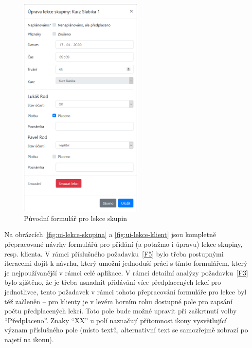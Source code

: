 \begin{figure}\centering
    \includegraphics[width=0.55\textwidth]{img/ui-screen-lekce-skupina.png}
    \caption{Původní formulář pro lekce skupin}\label{fig:ui-screen-lekce-skupina}
\end{figure}

Na obrázcích~\ref{fig:ui-lekce-skupina} a \ref{fig:ui-lekce-klient} jsou kompletně přepracované návrhy formulářů pro přidání (a potažmo i úpravu) lekce skupiny, resp. klienta. V rámci příslušného požadavku~\ref{F5} bylo třeba postupnými iteracemi dojít k návrhu, který umožní jednoduší práci s tímto formulářem, který je nejpoužívanější v rámci celé aplikace. V rámci detailní analýzy požadavku~\ref{F3} bylo zjištěno, že je třeba usnadnit přidávání více předplacených lekcí pro jednotlivce, tento požadavek v rámci tohoto přepracování formuláře pro lekce byl též začleněn -- pro klienty je v levém horním rohu dostupné pole pro zapsání počtu předplacených lekcí. Toto pole bude možné upravit při zaškrtnutí volby \enquote{Předplaceno}. Znaky \enquote{XX} u polí naznačují přítomnost ikony vysvětlující význam příslušného pole (místo textů, alternativní text se samozřejmě zobrazí po najetí na ikonu).

